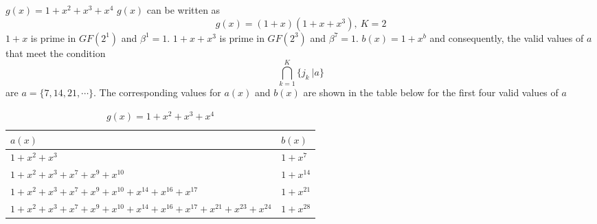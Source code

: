 \begin{example}
$g(x)=1+x^2+x^3+x^4$\newline
$g(x)$ can be written as $$g(x)=(1+x)(1+x+x^3),~K=2$$
 $1+x$ is prime in $GF(2^1)$ and $\beta^{1}=1$. $1+x+x^3$ is prime in $GF(2^3)$ and $\beta^{7}=1$. $b(x)=1+x^b$ and consequently, the valid values of $a$ that meet the condition $$ \bigcap_{k=1}^{K} \{j_k~| a\}$$ are $a=\{7,14,21,\cdots \}$.
The corresponding values for $a(x)$ and $b(x)$ are shown in the table below for the first four valid values of $a$

\begin{table*}[h]
\caption{$g(x)=1+x^2+x^3+x^4$}
\centering
 \begin{tabular}{p{4cm}| p{4cm}} 
 \hline
 $a(x)$ & $b(x)$  \\ [0.5ex] 
 \hline\hline
$1+x^2+x^3$ & $1+x^7$ \\ 
\hline
$1+x^2+x^3+x^7+x^9+x^{10}$ &  $1+x^{14}$ \\
\hline
$1+x^2+x^3+x^7+x^{9}+x^{10}+x^{14}+x^{16}+x^{17}$ & $1+x^{21}$ 
\\
\hline
$1+x^2+x^3+x^7+x^{9}+x^{10}+x^{14}+x^{16}+x^{17}+x^{21}+x^{23}+x^{24}$ & $1+x^{28}$
 \end{tabular}
 \label{novelTab6}
\end{table*}
\end{example}

\newpage



